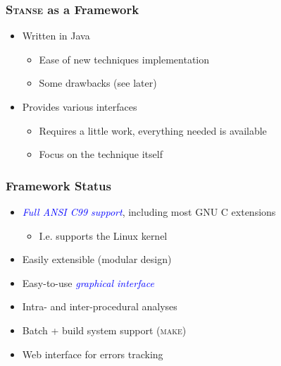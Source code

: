 \documentclass[xcolor=dvipsnames]{beamer}
\let\Oldemph\emph
\renewcommand{\emph}[1]{\textcolor{blue}{\Oldemph{#1}}}
\begin{document}
\begin{frame}
  \frametitle{\textsc{Stanse} as a Framework}
  
  \begin{itemize}
  \item Written in Java
  \begin{itemize}
  \item Ease of new techniques implementation
  \item Some drawbacks (see later)
  \end{itemize}

  \pause

  \item Provides various interfaces
  \begin{itemize}
  \item Requires a little work, everything needed is available
  \item Focus on the technique itself
  \end{itemize}
  \end{itemize}

\end{frame}

\begin{frame}
  \frametitle{Framework Status}

  \begin{itemize}
  \item \emph{Full ANSI C99 support}, including most GNU C extensions
    \begin{itemize}
    \item I.e. supports the Linux kernel
    \end{itemize}
  \item Easily extensible (modular design)
  \item Easy-to-use \emph{graphical interface}
  \item Intra- and inter-procedural analyses
  \item Batch + build system support (\textsc{make})
  \item Web interface for errors tracking
  \end{itemize}
\end{frame}
\end{document}

